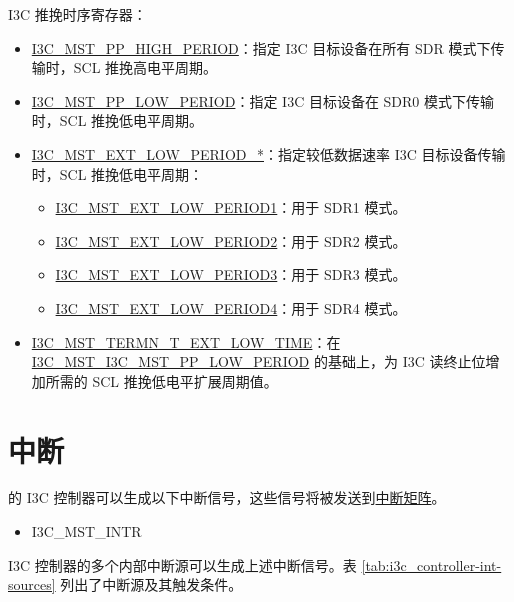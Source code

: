 \documentclass[main\_\_CN.tex]{subfiles}
\begin{document}
I3C 推挽时序寄存器：
\begin{itemize}
    \item \hyperref[fielddesc:I3CMSTREGI3CMSTPPHIGHPERIOD]{I3C\_MST\_PP\_HIGH\_PERIOD}：指定 I3C 目标设备在所有 SDR 模式下传输时，SCL 推挽高电平周期。
    \item \hyperref[fielddesc:I3CMSTREGI3CMSTPPLOWPERIOD]{I3C\_MST\_PP\_LOW\_PERIOD}：指定 I3C 目标设备在 SDR0 模式下传输时，SCL 推挽低电平周期。
    \item \hyperref[fielddesc:I3CMSTREGI3CMSTEXTLOWPERIOD1]{I3C\_MST\_EXT\_LOW\_PERIOD\_*}：指定较低数据速率 I3C 目标设备传输时，SCL 推挽低电平周期：
    \begin{itemize}
        \item \hyperref[fielddesc:I3CMSTREGI3CMSTEXTLOWPERIOD1]{I3C\_MST\_EXT\_LOW\_PERIOD1}：用于 SDR1 模式。
        \item \hyperref[fielddesc:I3CMSTREGI3CMSTEXTLOWPERIOD2]{I3C\_MST\_EXT\_LOW\_PERIOD2}：用于 SDR2 模式。
        \item \hyperref[fielddesc:I3CMSTREGI3CMSTEXTLOWPERIOD3]{I3C\_MST\_EXT\_LOW\_PERIOD3}：用于 SDR3 模式。
        \item \hyperref[fielddesc:I3CMSTREGI3CMSTEXTLOWPERIOD4]{I3C\_MST\_EXT\_LOW\_PERIOD4}：用于 SDR4 模式。
    \end{itemize}
    \item \hyperref[fielddesc:I3CMSTREGI3CMSTTERMNTEXTLOWTIME]{I3C\_MST\_TERMN\_T\_EXT\_LOW\_TIME}：在 \hyperref[fielddesc:I3CMSTREGI3CMSTPPLOWPERIOD]{I3C\_MST\_I3C\_MST\_PP\_LOW\_PERIOD} 的基础上，为 I3C 读终止位增加所需的 SCL 推挽低电平扩展周期值。
\end{itemize}


\section{中断}


\chipname{} 的 I3C 控制器可以生成以下中断信号，这些信号将被发送到\hyperref[mod:intmtrx]{中断矩阵}。

\begin{itemize}
    \item I3C\_MST\_INTR
\end{itemize}

I3C 控制器的多个内部中断源可以生成上述中断信号。表 \ref{tab:i3c_controller-int-sources} 列出了中断源及其触发条件。
\end{document}

